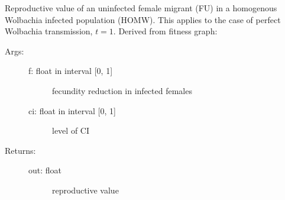 \documentclass[letterpaper,10pt,english]{sphinxmanual}
\begin{document}
\begin{fulllineitems}
\label{index:wspec.analytical.reproval_FUHOMW}
Reproductive value of an uninfected female migrant (FU) in a 
homogenous Wolbachia infected population (HOMW). This applies to 
the case of perfect Wolbachia transmission, $t=1$. Derived from 
fitness graph:
\begin{description}
\item[{Args:}] \leavevmode\begin{description}
\item[{f: float in interval {[}0, 1{]}}] \leavevmode
fecundity reduction in infected females

\item[{ci: float in interval {[}0, 1{]}}] \leavevmode
level of CI

\end{description}

\item[{Returns:}] \leavevmode\begin{description}
\item[{out: float}] \leavevmode
reproductive value

\end{description}

\end{description}

\end{fulllineitems}

\end{document}
